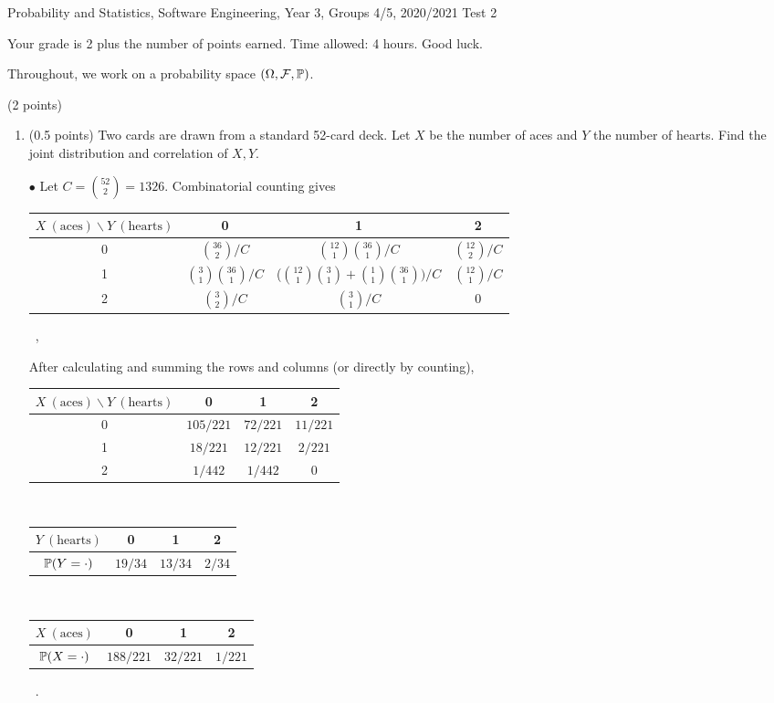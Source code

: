 \documentclass[a4paper]{report}
\begin{document}
\noindent Probability and Statistics, Software Engineering, Year 3, Groups 4/5, 2020/2021 \hfill Test 2

\hrulefill

\begin{it}
Your grade is 2 plus the number of points earned. Time allowed: 4 hours. Good luck.

Throughout, we work on a probability space $(\Omega, \cF, \P)$.

\end{it}

\begin{problem} (2 points)
\begin{enumerate}
    \item (0.5 points) Two cards are drawn from a standard 52-card deck. Let $X$ be the number of aces and $Y$ the number of hearts. Find the joint distribution and correlation of $X,Y$.

$\bullet$ Let $C=\binom{52}{2}=1326$. Combinatorial counting gives
\begin{center}
\begin{tabular}{ |c|c|c|c| }
 \hline
$X\ (\text{aces})\backslash Y\ (\text{hearts})$ & 0 & 1 & 2 \\
  \hline
 0 & $\binom{36}{2}/ C$& $\binom{12}{1} \binom{36}{1}/ C$ &   $\binom{12}{2}/ C$\\
 1 &  $\binom{3}{1} \binom{36}{1}/ C$ &  ($\binom{12}{1} \binom{3}{1} +
 \binom{1}{1} \binom{36}{1})/ C$ &  $\binom{12}{1}/ C$\\
 2 & $\binom{3}{2}/ C$& $\binom{3}{1}/ C $& 0\\
 \hline\end{tabular} \, ,
 \end{center}
After calculating and summing the rows and columns (or directly by counting),
 \begin{center}
\begin{tabular}{ |c|c|c|c| }
 \hline
$X\ (\text{aces})\backslash Y\ (\text{hearts})$ & 0 & 1 & 2 \\
  \hline
 0 & $105/221$& $72/221$ &   $11/221$\\
 1 &  $18/221$ &  $12/221$ &  $2/221$\\
 2 & $1/442$& $1/442$ & 0\\
 \hline
\end{tabular}
\\
\begin{tabular}{ |c|c|c|c| }
 \hline
$Y\ (\text{hearts})$ & 0 & 1 & 2 \\
  \hline
 $\P(Y = \cdot) $& $19/34$& $13/34$ &   $2/34$\\
 \hline
\end{tabular}
\\
\begin{tabular}{ |c|c|c|c| }
 \hline
$X\ (\text{aces})$ & 0 & 1 & 2 \\
  \hline
 $\P(X = \cdot) $& $188/221$& $32/221$ &   $1/221$\\
 \hline
\end{tabular} \, .


\end{center}
\end{enumerate}
\end{problem}
\end{document}
